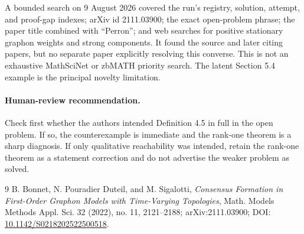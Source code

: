 \documentclass[11pt]{article}
\begin{document}
A bounded search on 9 August 2026 covered the run's registry, solution,
attempt, and proof-gap indexes; arXiv id 2111.03900; the exact open-problem
phrase; the paper title combined with ``Perron''; and web searches for positive
stationary graphon weights and strong components. It found the source and
later citing papers, but no separate paper explicitly resolving this converse.
This is not an exhaustive MathSciNet or zbMATH priority search. The latent
Section 5.4 example is the principal novelty limitation.

\paragraph{Human-review recommendation.}
Check first whether the authors intended Definition 4.5 in full in the open
problem. If so, the counterexample is immediate and the rank-one theorem is a
sharp diagnosis. If only qualitative reachability was intended, retain the
rank-one theorem as a statement correction and do not advertise the weaker
problem as solved.

\begin{thebibliography}{9}
B. Bonnet, N. Pouradier Duteil, and M. Sigalotti,
\emph{Consensus Formation in First-Order Graphon Models with Time-Varying
Topologies}, Math. Models Methods Appl. Sci. 32 (2022), no. 11, 2121--2188;
arXiv:2111.03900; DOI: \href{https://doi.org/10.1142/S0218202522500518}{10.1142/S0218202522500518}.
\end{thebibliography}
\end{document}

